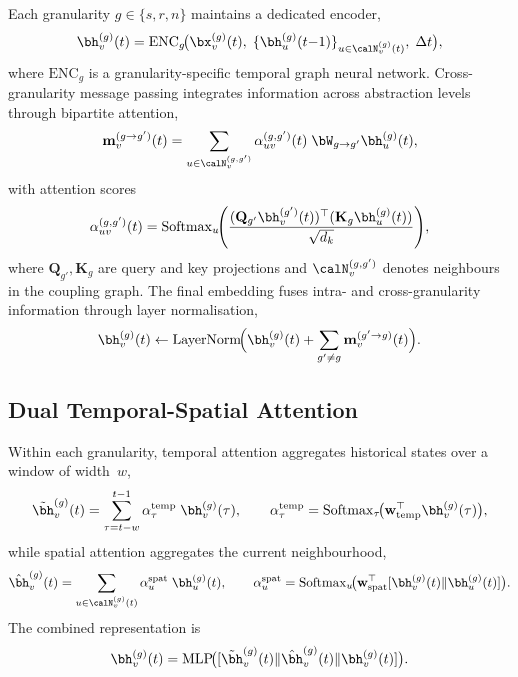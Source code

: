 Each granularity $g\in\{s,r,n\}$ maintains a dedicated encoder,
\begin{equation}
\bh_v^{(g)}(t)
= \mathrm{ENC}_g\!\bigl(
  \bx_v^{(g)}(t),\;
  \{\bh_u^{(g)}(t{-}1)\}_{u\in\calN_v^{(g)}(t)},\;
  \Delta t
\bigr),
\label{eq:triple_enc}
\end{equation}
where $\mathrm{ENC}_g$ is a granularity-specific temporal graph neural network. Cross-granularity message passing integrates information across abstraction levels through bipartite attention,
\begin{equation}
\mathbf{m}_v^{(g\to g')}(t)
= \sum_{u\in\calN_v^{(g,g')}}
  \alpha_{uv}^{(g,g')}(t)\;\bW_{g\to g'}\bh_u^{(g)}(t),
\label{eq:triple_cross_msg}
\end{equation}
with attention scores
\begin{equation}
\alpha_{uv}^{(g,g')}(t)
= \mathrm{Softmax}_u\!\Biggl(
  \frac{(\mathbf{Q}_{g'}\bh_v^{(g')}(t))^\top
        (\mathbf{K}_g\bh_u^{(g)}(t))}
       {\sqrt{d_k}}
\Biggr),
\label{eq:triple_cross_attn}
\end{equation}
where $\mathbf{Q}_{g'},\mathbf{K}_g$ are query and key projections and $\calN_v^{(g,g')}$ denotes neighbours in the coupling graph. The final embedding fuses intra- and cross-granularity information through layer normalisation,
\begin{equation}
\bh_v^{(g)}(t)
\leftarrow
\mathrm{LayerNorm}\!\Bigl(
  \bh_v^{(g)}(t)
  + \sum_{g'\neq g}\mathbf{m}_v^{(g'\to g)}(t)
\Bigr).
\label{eq:triple_fuse}
\end{equation}

\subsection{Dual Temporal-Spatial Attention}

Within each granularity, temporal attention aggregates historical states over a window of width~$w$,
\begin{equation}
\tilde{\bh}_v^{(g)}(t)
= \sum_{\tau=t-w}^{t-1}
  \alpha_\tau^{\mathrm{temp}}\;\bh_v^{(g)}(\tau),
\qquad
\alpha_\tau^{\mathrm{temp}}
= \mathrm{Softmax}_\tau\!\bigl(
  \mathbf{w}_{\mathrm{temp}}^\top\bh_v^{(g)}(\tau)\bigr),
\label{eq:triple_temp_attn}
\end{equation}
while spatial attention aggregates the current neighbourhood,
\begin{equation}
\hat{\bh}_v^{(g)}(t)
= \sum_{u\in\calN_v^{(g)}(t)}
  \alpha_u^{\mathrm{spat}}\;\bh_u^{(g)}(t),
\qquad
\alpha_u^{\mathrm{spat}}
= \mathrm{Softmax}_u\!\bigl(
  \mathbf{w}_{\mathrm{spat}}^\top
  [\bh_v^{(g)}(t)\|\bh_u^{(g)}(t)]\bigr).
\label{eq:triple_spat_attn}
\end{equation}
The combined representation is
\begin{equation}
\bh_v^{(g)}(t)
= \mathrm{MLP}\!\bigl(
  [\tilde{\bh}_v^{(g)}(t)\|
   \hat{\bh}_v^{(g)}(t)\|
   \bh_v^{(g)}(t)]
\bigr).
\label{eq:triple_combined}
\end{equation}

